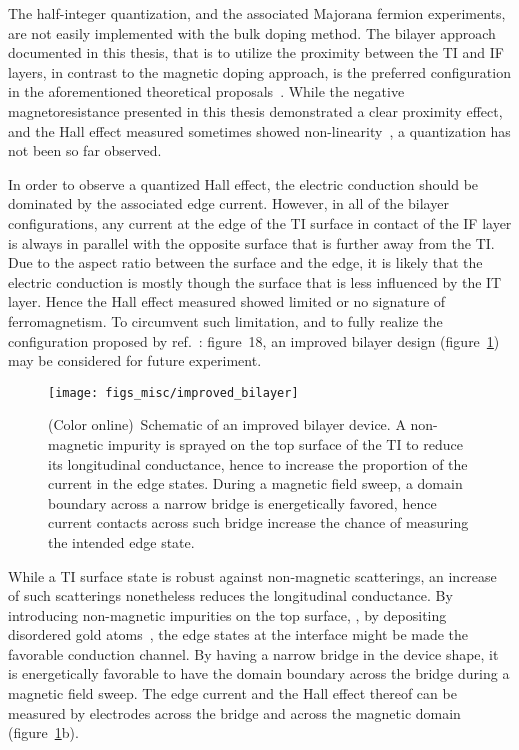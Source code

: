 The half-integer quantization, and the associated Majorana fermion experiments, are not easily implemented with the bulk doping method. The bilayer approach documented in this thesis, that is to utilize the proximity between the TI and IF layers, in contrast to the magnetic doping approach, is the preferred configuration in the aforementioned theoretical proposals~\cite{TI_Col, Akhmerov2009}. While the negative magnetoresistance presented in this thesis demonstrated a clear proximity effect, and the Hall effect measured sometimes showed non-linearity~\cite{Samarth2017, Petta2014}, a quantization has not been so far observed.

In order to observe a quantized Hall effect, the electric conduction should be dominated by the associated edge current. However, in all of the bilayer configurations, any current at the edge of the TI surface in contact of the IF layer is always in parallel with the opposite surface that is further away from the TI. Due to the aspect ratio between the surface and the edge, it is likely that the electric conduction is mostly though the surface that is less influenced by the IT layer. Hence the Hall effect measured showed limited or no signature of ferromagnetism. To circumvent such limitation, and to fully realize the configuration proposed by ref.~\cite{TI_Col}: figure~18, an improved bilayer design (figure~\ref{fig:improved_bilayer}) may be considered for future experiment.%
%
\begin{figure}[ht]%
    \centering%
    \texttt{[image: figs\_misc/improved\_bilayer]}%
    \caption[Schematic of an improved bilayer device]{\label{fig:improved_bilayer}(Color online)~Schematic of an improved bilayer device. A non-magnetic impurity is sprayed on the top surface of the TI to reduce its longitudinal conductance, hence to increase the proportion of the current in the edge states. During a magnetic field sweep, a domain boundary across a narrow bridge is energetically favored, hence current contacts across such bridge increase the chance of measuring the intended edge state.}%
\end{figure} %
%
While a TI surface state is robust against non-magnetic scatterings, an increase of such scatterings nonetheless reduces the longitudinal conductance. By introducing non-magnetic impurities on the top surface, , by depositing disordered gold atoms~\cite{TI_WAL_Hongkong}, the edge states at the interface might be made the favorable conduction channel. By having a narrow bridge in the device shape, it is energetically favorable to have the domain boundary across the bridge during a magnetic field sweep. The edge current and the Hall effect thereof can be measured by electrodes across the bridge and across the magnetic domain (figure~\ref{fig:improved_bilayer}b).
